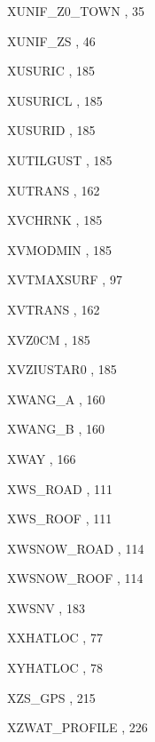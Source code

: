 \begin{theindex}
  \item XUNIF\_Z0\_TOWN
    \subitem {},  35
  \item XUNIF\_ZS
    \subitem {},  46
  \item XUSURIC
    \subitem {},  185
  \item XUSURICL
    \subitem {},  185
  \item XUSURID
    \subitem {},  185
  \item XUTILGUST
    \subitem {},  185
  \item XUTRANS
    \subitem {},  162
  \item XVCHRNK
    \subitem {},  185
  \item XVMODMIN
    \subitem {},  185
  \item XVTMAXSURF
    \subitem {},  97
  \item XVTRANS
    \subitem {},  162
  \item XVZ0CM
    \subitem {},  185
  \item XVZIUSTAR0
    \subitem {},  185
  \item XWANG\_A
    \subitem {},  160
  \item XWANG\_B
    \subitem {},  160
  \item XWAY
    \subitem {},  166
  \item XWS\_ROAD
    \subitem {},  111
  \item XWS\_ROOF
    \subitem {},  111
  \item XWSNOW\_ROAD
    \subitem {},  114
  \item XWSNOW\_ROOF
    \subitem {},  114
  \item XWSNV
    \subitem {},  183
  \item XXHATLOC
    \subitem {},  77
  \item XYHATLOC
    \subitem {},  78
  \item XZS\_GPS
    \subitem {},  215
  \item XZWAT\_PROFILE
    \subitem {},  226


\end{theindex}
